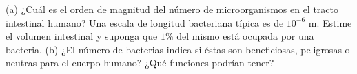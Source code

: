 \item (a) ¿Cuál es el orden de magnitud del número de microorganismos en el tracto intestinal humano? Una escala de longitud bacteriana típica es de $10^{-6} \text{ m}$. Estime el volumen intestinal y suponga que $1\%$ del mismo está ocupada por una bacteria. (b) ¿El número de bacterias indica si éstas son beneficiosas, peligrosas o neutras para el cuerpo humano? ¿Qué funciones podrían tener?
